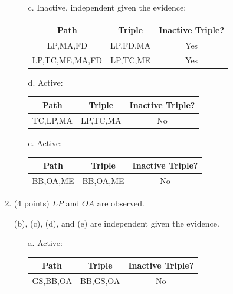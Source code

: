\documentclass[12pt]{article}
\begin{document}
\begin{enumerate}
\begin{enumerate}
		\item[c.]
		Inactive, independent given the evidence:
		\begin{center}
			\begin{tabular}{|c|c|c|}
				\hline
				Path & Triple & Inactive Triple? \\
				\hline
				LP,MA,FD & LP,FD,MA & Yes \\
				\hline
				LP,TC,ME,MA,FD & LP,TC,ME & Yes \\
				\hline
			\end{tabular}
		\end{center}

		\item[d.]
		Active:
		\begin{center}
			\begin{tabular}{|c|c|c|}
				\hline
				Path & Triple & Inactive Triple? \\
				\hline
				TC,LP,MA & LP,TC,MA & No \\
				\hline
			\end{tabular}
		\end{center}

		\item[e.]
		Active:
		\begin{center}
			\begin{tabular}{|c|c|c|}
				\hline
				Path & Triple & Inactive Triple? \\
				\hline
				BB,OA,ME & BB,OA,ME & No \\
				\hline
			\end{tabular}
		\end{center}

	\end{enumerate}

	\item (4 points) $LP$  and $OA$ are observed.

	(b), (c), (d), and (e) are independent given the evidence.

	\begin{enumerate}
		\item[a.]
		Active:
		\begin{center}
			\begin{tabular}{|c|c|c|}
				\hline
				Path & Triple & Inactive Triple? \\
				\hline
				GS,BB,OA & BB,GS,OA & No \\
				\hline
			\end{tabular}
		\end{center}


\end{enumerate}
\end{enumerate}
\end{document}
